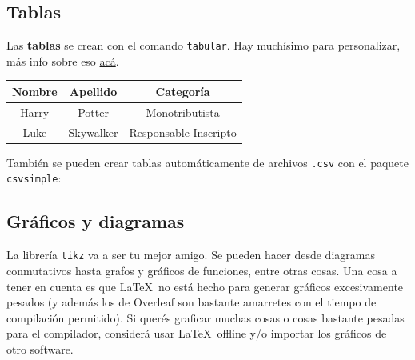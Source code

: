 \documentclass[12pt, spanish]{report}
\theoremstyle{definition} %
\theoremstyle{remark} %
\theoremstyle{plain} %
\theoremstyle{plain} %
\theoremstyle{plain} %
\theoremstyle{plain} %
\theoremstyle{plain} %
\theoremstyle{remark} %
\numberwithin{defn}{chapter}
\begin{document}
\lipsum[1] %

\subsection{Tablas}

Las \textbf{tablas} se crean con el comando \verb|tabular|. Hay muchísimo para personalizar, más info sobre eso \href{https://www.overleaf.com/learn/latex/Tables}{acá}.
\begin{center}
    \begin{tabular}{ ||c|c|c|| } 
     \hline
     Nombre & Apellido & Categoría \\ 
     \hline
     Harry & Potter & Monotributista \\ 
     Luke & Skywalker & Responsable Inscripto \\ 
     \hline
    \end{tabular}
\end{center}
También se pueden crear tablas automáticamente de archivos \verb|.csv| con el paquete \verb|csvsimple|:

\begin{center}
\end{center}

\subsection{Gráficos y diagramas}

La librería \verb|tikz| va a ser tu mejor amigo. Se pueden hacer desde diagramas conmutativos hasta grafos y gráficos de funciones, entre otras cosas. Una cosa a tener en cuenta es que \LaTeX\ no está hecho para generar gráficos excesivamente pesados (y además los de Overleaf son bastante amarretes con el tiempo de compilación permitido). Si querés graficar muchas cosas o cosas bastante pesadas para el compilador, considerá usar \LaTeX\ offline y/o importar los gráficos de otro software.
\end{document}

